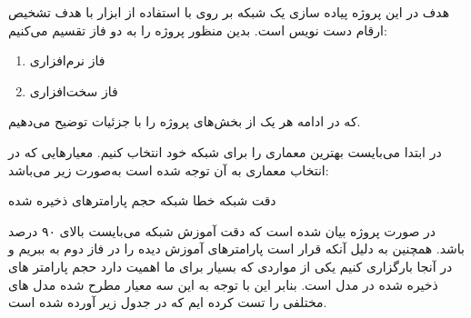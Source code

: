 \label{طراحی و شبیه‌سازی}


هدف در این پروژه پیاده سازی یک شبکه  بر روی  با استفاده از ابزار  با هدف تشخیص ارقام دست نویس است. بدین منظور پروژه را به دو فاز تقسیم می‌کنیم:
\begin{enumerate}
	\item فاز نرم‌افزاری
	\item فاز سخت‌افزاری
\end{enumerate}

که در ادامه هر یک از بخش‌های پروژه را با جزئیات توضیح می‌دهیم.




در ابتدا می‌بایست بهترین معماری را برای شبکه خود انتخاب کنیم. معیار‌هایی که در انتخاب معماری به آن توجه شده است به‌صورت زیر می‌باشد:


 دقت شبکه
 خطا شبکه
 حجم پارامتر‌های ذخیره شده


در صورت پروژه بیان شده است که دقت آموزش شبکه می‌بایست بالای ۹۰ درصد باشد. همچنین به دلیل آنکه قرار است پارامتر‌های آموزش دیده را در فاز دوم به  ببریم و در آنجا بارگزاری کنیم یکی از مواردی که بسیار برای ما اهمیت دارد حجم پارامتر های ذخیره شده در مدل است. بنابر این با توجه به این سه معیار مطرح شده مدل های مختلفی را تست کرده ایم که در جدول زیر آورده شده است. \\


	
\begin{table}[ht]
	\centering
	\caption{معماری‌های بررسی شده}
	\label{جدول:جدول معماری ها}
\end{table}



